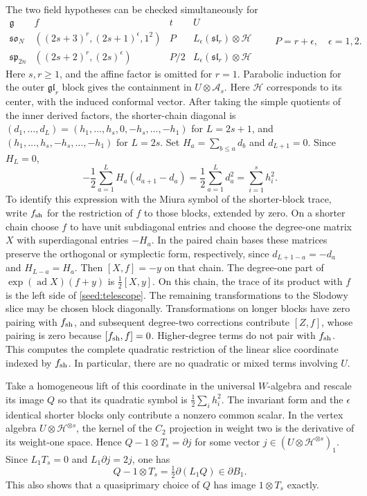 \documentclass[11pt,a4paper]{amsart}
\numberwithin{equation}{section}
\theoremstyle{definition}
\theoremstyle{remark}
\newcommand{\g}{\mathfrak g}
\newcommand{\spg}{\mathfrak{sp}}
\newcommand{\sog}{\mathfrak{so}}
\newcommand{\slg}{\mathfrak{sl}}
\newcommand{\glg}{\mathfrak{gl}}
\begin{document}
The two field hypotheses can be checked simultaneously for
$$
 \begin{array}{c|c|c|c}
 \g&f&t&U\\\hline
 \sog_N&((2s+3)^r,(2s+1)^\epsilon,1^2)&P&L_\epsilon(\slg_r)\otimes\mathcal H\\
 \spg_{2n}&((2s+2)^r,(2s)^\epsilon)&P/2&L_\epsilon(\slg_r)\otimes\mathcal H
 \end{array}
 \qquad P=r+\epsilon,\quad \epsilon=1,2.
$$
Here $s,r\ge1$, and the affine factor is omitted for $r=1$.
Parabolic induction for the outer $\glg_r$ block gives the containment
in $U\otimes\mathcal A_s$. Here $\mathcal H$ corresponds to its center,
with the induced conformal vector. After taking the simple quotients
of the inner derived factors, the shorter-chain diagonal is
$(d_1,\ldots,d_L)=(h_1,\ldots,h_s,0,-h_s,\ldots,-h_1)$ for
$L=2s+1$, and $(h_1,\ldots,h_s,-h_s,\ldots,-h_1)$ for $L=2s$.
Set $H_a=\sum_{b\le a}d_b$ and $d_{L+1}=0$. Since $H_L=0$,
\begin{equation}\label{seed:telescope}
 -\frac12\sum_{a=1}^{L}H_a(d_{a+1}-d_a)
       =\frac12\sum_{a=1}^{L}d_a^2
       =\sum_{i=1}^s h_i^2.
\end{equation}
To identify this expression with the Miura symbol of the shorter-block
trace, write $f_{\rm sh}$ for the restriction of $f$ to those blocks,
extended by zero. On a shorter chain choose $f$ to have unit
subdiagonal entries and choose the degree-one matrix $X$ with
superdiagonal entries $-H_a$. In the paired chain bases these matrices
preserve the orthogonal or symplectic form, respectively, since
$d_{L+1-a}=-d_a$ and $H_{L-a}=H_a$. Then $[X,f]=-y$ on that chain.
The degree-one part of $\exp(\operatorname{ad}X)(f+y)$ is
$\frac12[X,y]$. On this chain, the trace of its product with $f$
is the left side of \eqref{seed:telescope}. The remaining transformations
to the Slodowy slice may be chosen block diagonally. Transformations
on longer blocks have zero pairing with $f_{\rm sh}$, and subsequent
degree-two corrections contribute $[Z,f]$, whose pairing is zero
because $[f_{\rm sh},f]=0$. Higher-degree terms do not pair with
$f_{\rm sh}$. This computes the complete quadratic restriction of
the linear slice coordinate indexed by $f_{\rm sh}$. In particular,
there are no quadratic or mixed terms involving $U$.

Take a homogeneous lift of this coordinate in the universal
$W$-algebra and rescale its image $Q$ so that its quadratic symbol
is $\frac12\sum_i h_i^2$. The invariant form and the $\epsilon$
identical shorter blocks only contribute a nonzero common scalar.
In the vertex algebra $U\otimes\mathcal H^{\otimes s}$, the kernel
of the $C_2$ projection in weight two is the derivative of its
weight-one space. Hence $Q-1\otimes T_s=\partial j$ for some
vector $j\in(U\otimes\mathcal H^{\otimes s})_1$. Since $L_1T_s=0$ and
$L_1\partial j=2j$, one has
$$
 Q-1\otimes T_s=\tfrac12\partial(L_1Q)\in\partial B_1.
$$
This also shows that a quasiprimary choice of $Q$ has image
$1\otimes T_s$ exactly.
\end{document}
